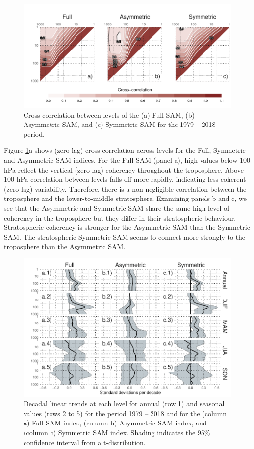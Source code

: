 \documentclass[smallextended]{svjour3}       %
\begin{document}
\begin{figure}
\includegraphics{cross-correlation-1} \caption{Cross correlation between levels of the (a) Full SAM, (b) Asymmetric SAM, and (c) Symmetric SAM for the 1979 -- 2018 period.}\label{fig:cross-correlation}
\end{figure}

Figure \ref{fig:cross-correlation}a shows (zero-lag) cross-correlation across levels for the Full, Symmetric and Asymmetric SAM indices. For the Full SAM (panel a), high values below 100 hPa reflect the vertical (zero-lag) coherency throughout the troposphere. Above 100 hPa correlation between levels falls off more rapidly, indicating less coherent (zero-lag) variability. Therefore, there is a non negligible correlation between the troposphere and the lower-to-middle stratosphere. Examining panels b and c, we see that the Asymmetric and Symmetric SAM share the same high level of coherency in the troposphere but they differ in their stratospheric behaviour. Stratospheric coherency is stronger for the Asymmetric SAM than the Symmetric SAM. The stratospheric Symmetric SAM seems to connect more strongly to the troposphere than the Asymmetric SAM.

\begin{figure}
\includegraphics{trends-1} \caption{Decadal linear trends at each level for annual (row 1) and seasonal values (rows 2 to 5) for the period 1979 -- 2018 and for the (column a) Full SAM index, (column b) Asymmetric SAM index, and (column c) Symmetric SAM index. Shading indicates the 95\% confidence interval from a t-distribution.}\label{fig:trends}
\end{figure}
\end{document}
